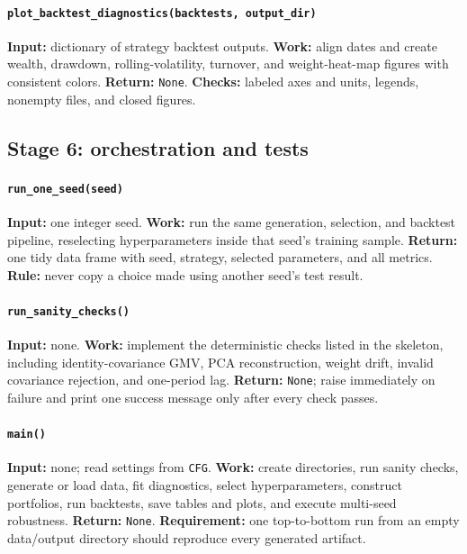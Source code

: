 \documentclass[10pt]{article}
\begin{document}
\begin{sloppypar}
\paragraph{\texttt{plot\_backtest\_diagnostics(backtests, output\_dir)}}
\textbf{Input:} dictionary of strategy backtest outputs.
\textbf{Work:} align dates and create wealth, drawdown, rolling-volatility,
turnover, and weight-heat-map figures with consistent colors.
\textbf{Return:} \texttt{None}. \textbf{Checks:} labeled axes and units,
legends, nonempty files, and closed figures.

\subsection*{Stage 6: orchestration and tests}

\paragraph{\texttt{run\_one\_seed(seed)}}
\textbf{Input:} one integer seed. \textbf{Work:} run the same generation,
selection, and backtest pipeline, reselecting hyperparameters inside that
seed's training sample. \textbf{Return:} one tidy data frame with seed,
strategy, selected parameters, and all metrics. \textbf{Rule:} never copy a
choice made using another seed's test result.

\paragraph{\texttt{run\_sanity\_checks()}}
\textbf{Input:} none. \textbf{Work:} implement the deterministic checks listed
in the skeleton, including identity-covariance GMV, PCA reconstruction, weight
drift, invalid covariance rejection, and one-period lag.
\textbf{Return:} \texttt{None}; raise immediately on failure and print one
success message only after every check passes.

\paragraph{\texttt{main()}}
\textbf{Input:} none; read settings from \texttt{CFG}.
\textbf{Work:} create directories, run sanity checks, generate or load data,
fit diagnostics, select hyperparameters, construct portfolios, run backtests,
save tables and plots, and execute multi-seed robustness.
\textbf{Return:} \texttt{None}. \textbf{Requirement:} one top-to-bottom run
from an empty data/output directory should reproduce every generated artifact.

\end{sloppypar}
\end{document}
